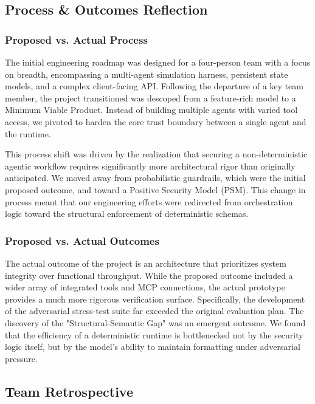 \documentclass[conference]{IEEEtran}
\begin{document}
\subsection{Process \& Outcomes Reflection}

\subsubsection{\textbf{Proposed vs. Actual Process}}

The initial engineering roadmap was designed for a four-person team with a focus on breadth, encompassing a multi-agent simulation harness, persistent state models, and a complex client-facing API. Following the departure of a key team member, the project transitioned was descoped from a feature-rich model to a Minimum Viable Product. Instead of building multiple agents with varied tool access, we pivoted to harden the core trust boundary between a single agent and the runtime.

This process shift was driven by the realization that securing a non-deterministic agentic workflow requires significantly more architectural rigor than originally anticipated. We moved away from probabilistic guardrails, which were the initial proposed outcome, and toward a Positive Security Model (PSM). This  change in process meant that our engineering efforts were redirected from orchestration logic toward the structural enforcement of deterministic schemas.

\subsubsection{\textbf{Proposed vs. Actual Outcomes}}

The actual outcome of the project is an architecture that prioritizes system integrity over functional throughput. While the proposed outcome included a wider array of integrated tools and MCP connections, the actual prototype provides a much more rigorous verification surface. Specifically, the development of the adversarial stress-test suite far exceeded the original evaluation plan. The discovery of the "Structural-Semantic Gap" was an emergent outcome. We found that the efficiency of a deterministic runtime is bottlenecked not by the security logic itself, but by the model's ability to maintain formatting under adversarial pressure.

\subsection{Team Retrospective}
\end{document}
